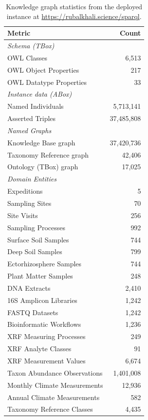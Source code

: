 \begin{table}[h]
	\centering
	\caption{Knowledge graph statistics from the deployed instance at \url{https://rubalkhali.science/sparql}.}
	\label{tab:stats}
	\begin{tabular}{lr}
		\toprule
		Metric                        & Count      \\
		\midrule
		\multicolumn{2}{l}{\textit{Schema (TBox)}}  \\
		OWL Classes                   & 6,513      \\
		OWL Object Properties         & 217        \\
		OWL Datatype Properties       & 33         \\
		\midrule
		\multicolumn{2}{l}{\textit{Instance data (ABox)}} \\
		Named Individuals             & 5,713,141  \\
		Asserted Triples              & 37,485,808 \\
		\midrule
		\multicolumn{2}{l}{\textit{Named Graphs}}   \\
		Knowledge Base graph          & 37,420,736 \\
		Taxonomy Reference graph      & 42,406     \\
		Ontology (TBox) graph         & 17,025     \\
		\midrule
		\multicolumn{2}{l}{\textit{Domain Entities}} \\
		Expeditions                   & 5          \\
		Sampling Sites                & 70         \\
		Site Visits                   & 256        \\
		Sampling Processes            & 992        \\
		Surface Soil Samples          & 744        \\
		Deep Soil Samples             & 799        \\
		Ectorhizosphere Samples           & 744        \\
		Plant Matter Samples          & 248        \\
		DNA Extracts                  & 2,410      \\
		16S Amplicon Libraries        & 1,242      \\
		FASTQ Datasets                & 1,242      \\
		Bioinformatic Workflows       & 1,236      \\
		XRF Measuring Processes       & 249        \\
		XRF Analyte Classes           & 91         \\
		XRF Measurement Values        & 6,674      \\
		Taxon Abundance Observations  & 1,401,008  \\
		Monthly Climate Measurements  & 12,936     \\
		Annual Climate Measurements   & 582        \\
		Taxonomy Reference Classes    & 4,435      \\
		\bottomrule
	\end{tabular}
\end{table}
